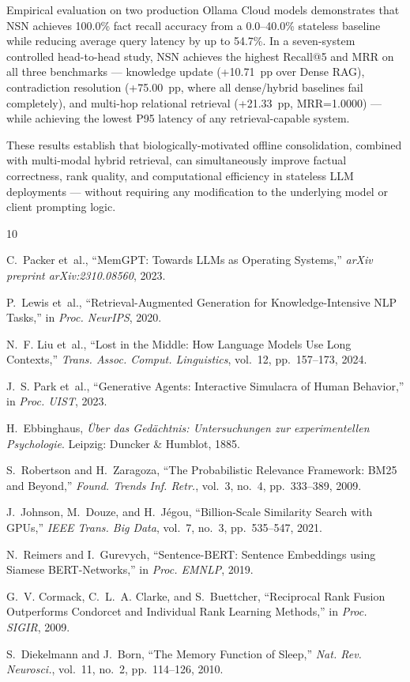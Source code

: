 \documentclass[conference]{IEEEtran}
\begin{document}
Empirical evaluation on two production Ollama Cloud models demonstrates that NSN achieves 100.0\% fact recall accuracy from a 0.0--40.0\% stateless baseline while reducing average query latency by up to 54.7\%. In a seven-system controlled head-to-head study, NSN achieves the highest Recall@5 and MRR on all three benchmarks --- knowledge update (+10.71~pp over Dense RAG), contradiction resolution (+75.00~pp, where all dense/hybrid baselines fail completely), and multi-hop relational retrieval (+21.33~pp, MRR=1.0000) --- while achieving the lowest P95 latency of any retrieval-capable system.

These results establish that biologically-motivated offline consolidation, combined with multi-modal hybrid retrieval, can simultaneously improve factual correctness, rank quality, and computational efficiency in stateless LLM deployments --- without requiring any modification to the underlying model or client prompting logic.


\begin{thebibliography}{10}

C.~Packer et~al., ``MemGPT: Towards LLMs as Operating Systems,'' \emph{arXiv preprint arXiv:2310.08560}, 2023.

P.~Lewis et~al., ``Retrieval-Augmented Generation for Knowledge-Intensive NLP Tasks,'' in \emph{Proc. NeurIPS}, 2020.

N.~F. Liu et~al., ``Lost in the Middle: How Language Models Use Long Contexts,'' \emph{Trans. Assoc. Comput. Linguistics}, vol.~12, pp.~157--173, 2024.

J.~S. Park et~al., ``Generative Agents: Interactive Simulacra of Human Behavior,'' in \emph{Proc. UIST}, 2023.

H.~Ebbinghaus, \emph{\"Uber das Ged\"achtnis: Untersuchungen zur experimentellen Psychologie}. Leipzig: Duncker \& Humblot, 1885.

S.~Robertson and H.~Zaragoza, ``The Probabilistic Relevance Framework: BM25 and Beyond,'' \emph{Found. Trends Inf. Retr.}, vol.~3, no.~4, pp.~333--389, 2009.

J.~Johnson, M.~Douze, and H.~J{\'e}gou, ``Billion-Scale Similarity Search with GPUs,'' \emph{IEEE Trans. Big Data}, vol.~7, no.~3, pp.~535--547, 2021.

N.~Reimers and I.~Gurevych, ``Sentence-BERT: Sentence Embeddings using Siamese BERT-Networks,'' in \emph{Proc. EMNLP}, 2019.

G.~V. Cormack, C.~L.~A. Clarke, and S.~Buettcher, ``Reciprocal Rank Fusion Outperforms Condorcet and Individual Rank Learning Methods,'' in \emph{Proc. SIGIR}, 2009.

S.~Diekelmann and J.~Born, ``The Memory Function of Sleep,'' \emph{Nat. Rev. Neurosci.}, vol.~11, no.~2, pp.~114--126, 2010.

\end{thebibliography}
\end{document}
